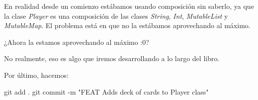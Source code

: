   En realidad desde un comienzo estábamos usando composición sin saberlo, ya que la clase 
  \textit{Player} es una composición de las clases \textit{String}, \textit{Int}, 
  \textit{MutableList} y \textit{MutableMap}.
  El problema está en que no la estábamos aprovechando al máximo.

  \begin{center}
    ¿Ahora la estamos aprovechando al máximo :0?
  \end{center}

  No realmente, eso es algo que iremos desarrollando a lo largo del libro.

  Por último, hacemos:

  \begin{powershell}
    git add .
    git commit -m "FEAT Adds deck of cards to Player class"
  \end{powershell}
